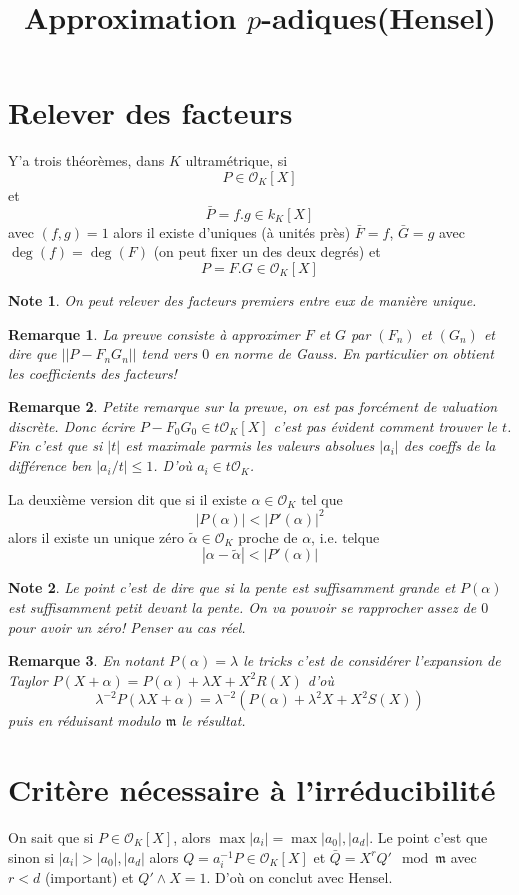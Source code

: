 \documentclass[a4paper,12pt]{book}
\title{Approximation $p$-adiques(Hensel)}
\date{}
\newcommand{\Or}{\mathcal{O}}
\newcommand{\m}{\mathfrak m}
\theoremstyle{plain}
\newtheorem{rem}{Remarque}
\newtheorem{note}{Note}
\theoremstyle{definition}
\theoremstyle{remark}
\begin{document}
\maketitle


\section{Relever des facteurs}
Y'a trois théorèmes, dans $K$ ultramétrique, si 
\[P\in \Or_K[X]\]
et
\[\bar P= f.g\in k_K[X]\]
avec $(f,g)=1$ alors il existe d'uniques (à unités près)
$\bar F=f$, $\bar G=g$ 
avec $\deg(f)=\deg(F)$ (on peut fixer un des deux degrés) et
\[P=F.G\in \Or_K[X]\]
\begin{note}
    On peut relever des facteurs premiers entre eux de manière
    unique.
\end{note}
\begin{rem}
    La preuve consiste à approximer $F$ et $G$ par $(F_n)$
    et $(G_n)$ et dire que $||P-F_nG_n||$ tend vers $0$ en
    norme de Gauss. En particulier on obtient les coefficients
    des facteurs!
\end{rem}
\begin{rem}
    Petite remarque sur la preuve, on est pas forcément de 
    valuation discrète. Donc écrire $P-F_0G_0\in t\Or_K[X]$
    c'est pas évident comment trouver le $t$. Fin c'est
    que si $|t|$ est maximale parmis les valeurs absolues
    $|a_i|$ des coeffs de la différence ben $|a_i/t|\leq 1$.
    D'où $a_i\in t\Or_K$.
\end{rem}
La deuxième version dit que si il existe $\alpha\in \Or_K$
tel que \[|P(\alpha)|<|P'(\alpha)|^2\] alors il existe un unique
zéro $\widetilde\alpha\in \Or_K$ proche de $\alpha$, i.e. 
telque 
\[|\alpha-\tilde\alpha|<|P'(\alpha)|\]
\begin{note}
    Le point c'est de dire que si la pente est suffisamment grande
    et $P(\alpha)$ est suffisamment petit devant la pente. On
    va pouvoir se rapprocher assez de $0$ pour avoir un zéro!
    Penser au cas réel.
\end{note}
\begin{rem}
    En notant $P(\alpha)=\lambda$ le tricks c'est de considérer 
    l'expansion de Taylor $P(X+\alpha)=P(\alpha)+\lambda X+X^2R(X)$
    d'où
    \[\lambda^{-2}P(\lambda X+\alpha)=\lambda^{-2}(P(\alpha)+\lambda^2 X+X^2S(X))\]
    puis en réduisant modulo $\m$ le résultat.
\end{rem}
\section{Critère nécessaire à l'irréducibilité}
On sait que si $P\in \Or_K[X]$, alors 
$\max |a_i|=\max |a_0|,|a_d|$. Le point c'est que sinon si 
$|a_i|>|a_0|,|a_d|$ alors $Q=a_i^{-1}P\in\Or_K[X]$ et 
$\bar Q=X^rQ'\mod \m$ avec $r<d$ (important) et $Q'\wedge X=1$.
D'où on conclut avec Hensel.
\end{document}
